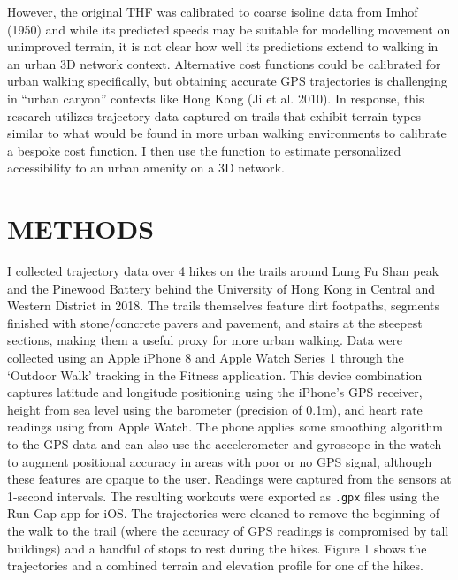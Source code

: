 \documentclass{article}
\begin{document}
However, the original THF was calibrated to coarse isoline data from
Imhof (1950) and while its predicted speeds may be suitable for
modelling movement on unimproved terrain, it is not clear how well its
predictions extend to walking in an urban 3D network context.
Alternative cost functions could be calibrated for urban walking
specifically, but obtaining accurate GPS trajectories is challenging in
``urban canyon'' contexts like Hong Kong (Ji et al. 2010). In response,
this research utilizes trajectory data captured on trails that exhibit
terrain types similar to what would be found in more urban walking
environments to calibrate a bespoke cost function. I then use the
function to estimate personalized accessibility to an urban amenity on a
3D network.

\hypertarget{methods}{%
\section{METHODS}\label{methods}}

I collected trajectory data over 4 hikes on the trails around Lung Fu
Shan peak and the Pinewood Battery behind the University of Hong Kong in
Central and Western District in 2018. The trails themselves feature dirt
footpaths, segments finished with stone/concrete pavers and pavement,
and stairs at the steepest sections, making them a useful proxy for more
urban walking. Data were collected using an Apple iPhone 8 and Apple
Watch Series 1 through the `Outdoor Walk' tracking in the Fitness
application. This device combination captures latitude and longitude
positioning using the iPhone's GPS receiver, height from sea level using
the barometer (precision of 0.1m), and heart rate readings using from
Apple Watch. The phone applies some smoothing algorithm to the GPS data
and can also use the accelerometer and gyroscope in the watch to augment
positional accuracy in areas with poor or no GPS signal, although these
features are opaque to the user. Readings were captured from the sensors
at 1-second intervals. The resulting workouts were exported as
\texttt{.gpx} files using the Run Gap app for iOS. The trajectories were
cleaned to remove the beginning of the walk to the trail (where the
accuracy of GPS readings is compromised by tall buildings) and a handful
of stops to rest during the hikes. Figure 1 shows the trajectories and a
combined terrain and elevation profile for one of the hikes.
\end{document}
